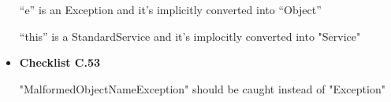 \documentclass[../../../../codeInspection.tex]{subfiles}
\begin{document}
\begin{itemize}
				  “e” is an Exception and it’s implicitly converted into “Object”

				  

				  “this” is a StandardService and it's implocitly converted into "Service"

			\item \textbf{Checklist C.53}

				  

				  "MalformedObjectNameException" should be caught instead of "Exception"

		\end{itemize}
\end{document}
